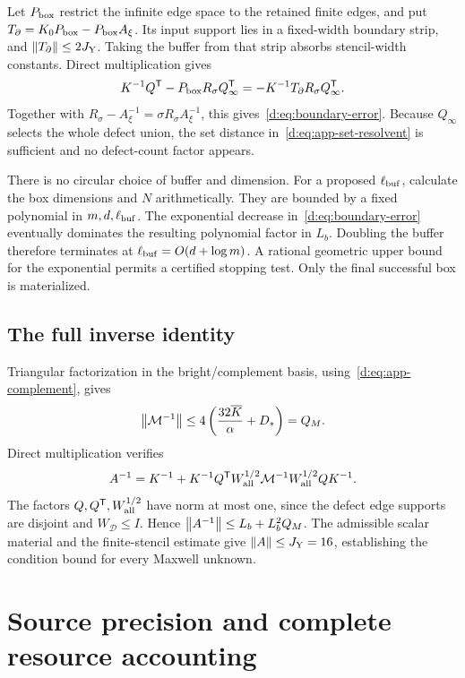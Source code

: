 Let $P_{\rm box}$ restrict the infinite edge space to the retained finite edges, and put $T_\partial=K_0P_{\rm box}-P_{\rm box}A_\xi$. Its input support lies in a fixed-width boundary strip, and $\left\lVert T_\partial\right\rVert\le2J_{\rm Y}$. Taking the buffer from that strip absorbs stencil-width constants. Direct multiplication gives
\[
 K^{-1}Q^{\mathsf T}-P_{\rm box}R_\sigma Q_\infty^{\mathsf T}
 =-K^{-1}T_\partial R_\sigma Q_\infty^{\mathsf T}.
\]
Together with $R_\sigma-A_\xi^{-1}=\sigma R_\sigma A_\xi^{-1}$, this gives~\eqref{d:eq:boundary-error}. Because $Q_\infty$ selects the whole defect union, the set distance in~\eqref{d:eq:app-set-resolvent} is sufficient and no defect-count factor appears.

There is no circular choice of buffer and dimension. For a proposed $\ell_{\rm buf}$, calculate the box dimensions and $N$ arithmetically. They are bounded by a fixed polynomial in $m,d,\ell_{\rm buf}$. The exponential decrease in~\eqref{d:eq:boundary-error} eventually dominates the resulting polynomial factor in $L_b$. Doubling the buffer therefore terminates at $\ell_{\rm buf}=O(d+\log m)$. A rational geometric upper bound for the exponential permits a certified stopping test. Only the final successful box is materialized.

\subsection{The full inverse identity}

Triangular factorization in the bright/complement basis, using~\eqref{d:eq:app-complement}, gives
\[
 \left\lVert \mathcal M^{-1}\right\rVert
 \le4\left(\frac{32\overline K}{\alpha}+D_*\right)=Q_M.
\]
Direct multiplication verifies
\begin{equation}\label{d:eq:app-woodbury}
 A^{-1}=K^{-1}+K^{-1}Q^{\mathsf T}W_{\rm all}^{1/2}
 \mathcal M^{-1}W_{\rm all}^{1/2}QK^{-1}.
\end{equation}
The factors $Q,Q^{\mathsf T},W_{\rm all}^{1/2}$ have norm at most one, since the defect edge supports are disjoint and $W_{\mathcal D}\le I$. Hence $\left\lVert A^{-1}\right\rVert\le L_b+L_b^2Q_M$. The admissible scalar material and the finite-stencil estimate give $\left\lVert A\right\rVert\le J_{\rm Y}=16$, establishing the condition bound for every Maxwell unknown.

\section{Source precision and complete resource accounting}\label{d:app:precision}

